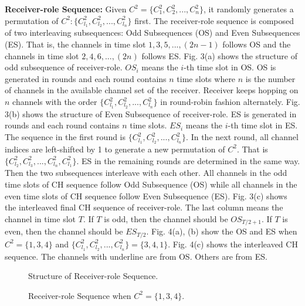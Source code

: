 \documentclass[journal]{IEEEtran}
\begin{document}
\par \textbf{Receiver-role Sequence: }Given $C^2=\{C_1^2, C_2^2, ..., C_n^2\}$, it randomly generates a permutation of $C^2: \{C_{l_1}^2, C_{l_2}^2, ..., C_{l_n}^2\}$ first. The receiver-role sequence is composed of two interleaving subsequences: Odd Subsequences (OS) and Even Subsequences (ES). That is, the channels in time slot $1, 3, 5, ..., (2n-1)$ follows OS and the channels in time slot $2, 4, 6, ..., (2n)$ follows ES. Fig. 3(a) shows the structure of odd subsequence of receiver-role. $OS_i$ means the $i$-th time slot in OS. OS is generated in rounds and each round contains $n$ time slots where $n$ is the number of channels in the available channel set of the receiver. Receiver keeps hopping on $n$ channels with the order $\{C_{l_1}^2, C_{l_2}^2, ..., C_{l_n}^2\}$ in round-robin fashion alternately. Fig. 3(b) shows the structure of Even Subsequence of receiver-role. ES is generated in rounds and each round contains $n$ time slots. $ES_i$ means the $i$-th time slot in ES. The sequence in the first round is $\{C_{l_1}^2, C_{l_2}^2, ..., C_{l_n}^2\}$. In the next round, all channel indices are left-shifted by 1 to generate a new permutation of $C^2$. That is $\{C_{l_2}^2, C_{l_3}^2, ..., C_{l_n}^2, C_{l_1}^2\}$. ES in the remaining rounds are determined in the same way. Then the two subsequences interleave with each other. All channels in the odd time slots of CH sequence follow Odd Subsequence (OS) while all channels in the even time slots of CH sequence follow Even Subsequence (ES). Fig. 3(c) shows the interleaved final CH sequence of receiver-role. The last column means the channel in time slot $T$. If $T$ is odd, then the channel should be $OS_{T/2+1}$. If $T$ is even, then the channel should be $ES_{T/2}$. Fig. 4(a), (b) show the OS and ES when $C^2=\{1, 3, 4\}$ and $\{C_{l_1}^2, C_{l_2}^2, ..., C_{l_n}^2\}=\{3, 4, 1\}$. Fig. 4(c) shows the interleaved CH sequence. The channels with underline are from OS. Others are from ES.
\begin{figure*}
\centering
{}
\hspace{1in}
\caption{Structure of Receiver-role Sequence.}
\label{fig:subfig} \end{figure*}
\begin{figure}
\centering
{}
\hspace{1in}
\caption{Receiver-role Sequence when $C^2=\{1, 3, 4\}$.}
\label{fig:subfig} \end{figure}
\end{document}
